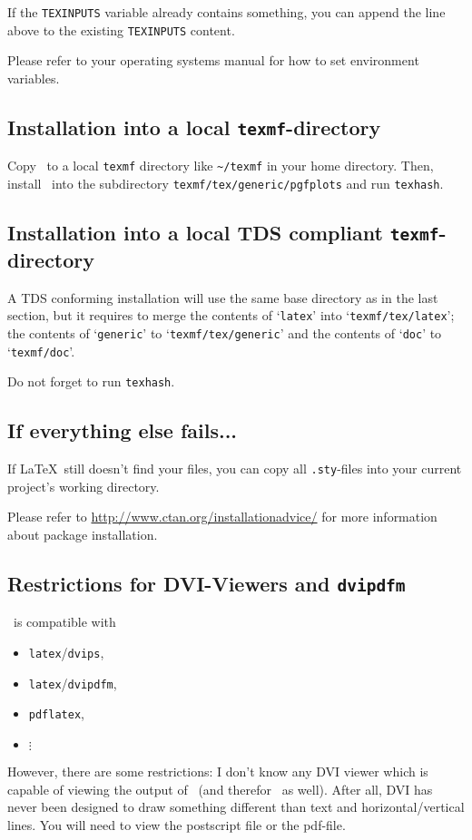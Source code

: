 If the \texttt{TEXINPUTS} variable already contains something, you can append the line above to the existing \texttt{TEXINPUTS} content.

Please refer to your operating systems manual for how to set environment variables.

\subsection{Installation into a local \texttt{texmf}-directory}
Copy \PGFPlots\ to a local \texttt{texmf} directory like \lstinline!~/texmf! in your home directory. Then, install \PGFPlots\ into the subdirectory \lstinline!texmf/tex/generic/pgfplots! and run \lstinline!texhash!.

\subsection{Installation into a local TDS compliant \texttt{texmf}-directory}
A TDS conforming installation will use the same base directory as in the last section, but it requires to merge the contents of `\texttt{latex}' into `\texttt{texmf/tex/latex}'; the contents of `\texttt{generic}' to `\texttt{texmf/tex/generic}' and the contents of `\texttt{doc}' to `\texttt{texmf/doc}'.

Do not forget to run \lstinline!texhash!.

\subsection{If everything else fails...}
If \LaTeX\ still doesn't find your files, you can copy all \lstinline!.sty!-files into your current project's working directory.

Please refer to \url{http://www.ctan.org/installationadvice/} for more information about package installation.



\subsection{Restrictions for DVI-Viewers and \texttt{dvipdfm}}
\label{sec:drivers}%
\PGF\ is compatible with 
\begin{itemize}
	\item \lstinline!latex!/\lstinline!dvips!,
	\item \lstinline!latex!/\lstinline!dvipdfm!,
	\item \lstinline!pdflatex!,
	\item $\vdots$
\end{itemize}
However, there are some restrictions: I don't know any DVI viewer which is capable of viewing the output of \PGF\ (and therefor \PGFPlots\ as well). After all, DVI has never been designed to draw something different than text and horizontal/vertical lines. You will need to view the postscript file or the pdf-file.


